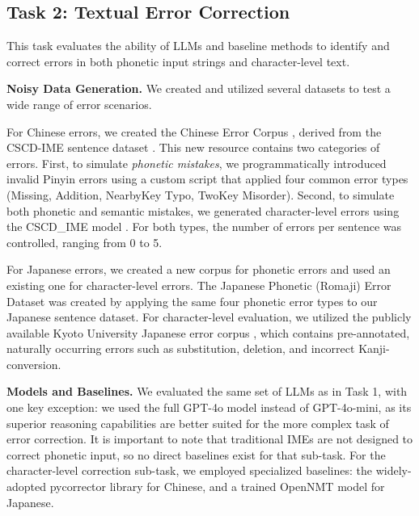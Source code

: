 \documentclass[10pt, a4paper]{article}
\begin{document}

\subsection{Task 2: Textual Error Correction}

This task evaluates the ability of LLMs and baseline methods to identify and correct errors in both phonetic input strings and character-level text.

\textbf{Noisy Data Generation.}
We created and utilized several datasets to test a wide range of error scenarios.
    
{For Chinese errors,} we created the {Chinese Error Corpus} , derived from the CSCD-IME sentence dataset . This new resource contains two categories of errors. First, to simulate \textit{phonetic mistakes}, we programmatically introduced {invalid Pinyin errors} using a custom script that applied four common error types (Missing, Addition, NearbyKey Typo, TwoKey Misorder). Second, to simulate both phonetic and semantic mistakes, we generated character-level errors 
using the CSCD\_IME model . For both types, the number of errors per sentence was controlled, ranging from 0 to 5.
    
{For Japanese errors,} we created a new corpus for phonetic errors and used an existing one for character-level errors. The {Japanese Phonetic (Romaji) Error Dataset}  was created by applying the same four phonetic error types to our Japanese sentence dataset. For character-level evaluation, we utilized the publicly available {Kyoto University Japanese error corpus} , which contains pre-annotated, naturally occurring errors such as substitution, deletion, and incorrect Kanji-conversion.

\textbf{Models and Baselines.}
We evaluated the same set of LLMs as in Task 1, with one key exception: we used the full GPT-4o model instead of GPT-4o-mini, as its superior reasoning capabilities are better suited for the more complex task of error correction. It is important to note that traditional IMEs are not designed to correct phonetic input, so no direct baselines exist for that sub-task. For the character-level correction sub-task, we employed specialized baselines: the widely-adopted {pycorrector} library \citep{pycorrector} for Chinese, and a trained {OpenNMT} \citep{klein2017opennmt} model for Japanese.
\end{document}
